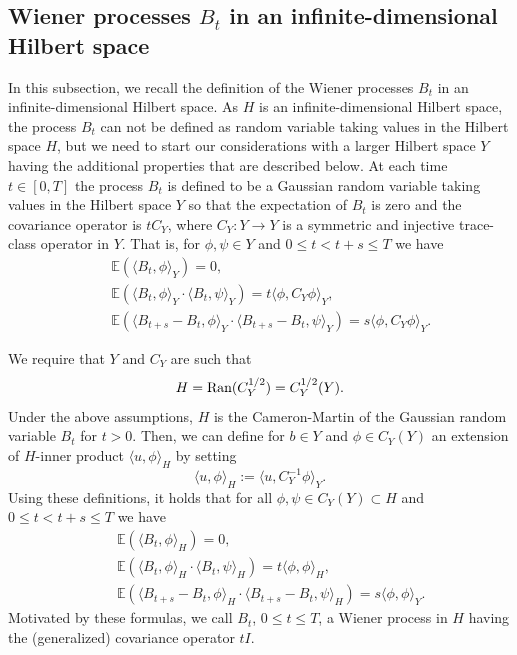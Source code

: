 \documentclass[10pt]{article} %
\theoremstyle{plain}
\theoremstyle{definition}
\theoremstyle{remark}
\begin{document}
\subsection{Wiener processes $B_t$ in an infinite-dimensional Hilbert space}
\label{subsec: Wiener process definition}
\label{appendix:wiener_process}

In this subsection, we recall the definition of the Wiener processes $B_t$ in an infinite-dimensional Hilbert space.  As $H$ is an infinite-dimensional Hilbert space, the process 
$B_t$ can not be defined as random variable taking values in the Hilbert space $H$, but we need
to start our considerations with a larger Hilbert space $Y$ having the additional properties
that are described below.
At each time $t\in [0,T]$ the process $B_t$ is defined to be a Gaussian random
variable taking values in the Hilbert space $Y$ so that
 the expectation of $B_t$ is zero and the covariance operator  is
$tC_Y$, where $C_Y\colon Y\to Y$ is a symmetric and injective trace-class operator in $Y$.
That is, for $\phi,\psi\in Y$ and $0\le t<t+s\le T$ we have
\begin{eqnarray*}
& &    \mathbb E(\langle B_t, \phi\rangle_Y)=0,\\
& &\mathbb E( \langle B_t, \phi\rangle_Y\cdot 
\langle B_t, \psi\rangle_Y)=t\langle \phi,C_Y \phi\rangle_Y,
\\
& &\mathbb E( \langle B_{t+s}-B_t, \phi\rangle_Y\cdot\langle B_{t+s}-B_t, \psi\rangle_Y)=s\langle \phi,C_Y \phi\rangle_Y.
\end{eqnarray*}

We require that $Y$ and $C_Y$ are such that
\begin{equation*}
H=\hbox{Ran}(C_Y^{1/2})=C_Y^{1/2}(Y).
\end{equation*}
Under the above assumptions, $H$ is the Cameron-Martin 
of the Gaussian random variable $B_t$ for $t>0$. Then, we can define for $b\in Y$ and $\phi\in C_Y(Y)$ an
extension of $H$-inner product $\langle u, \phi\rangle_H$
by setting
$$
\langle u, \phi\rangle_H:=\langle u,C_Y^{-1} \phi\rangle_Y.
$$
Using these definitions,
it holds that for all $\phi,\psi\in C_Y(Y)\subset H$ and $0\le t<t+s\le T$ we have
\begin{eqnarray*}
& &    \mathbb E(\langle B_t, \phi\rangle_H)=0,\\
& &\mathbb E( \langle B_t, \phi\rangle_H\cdot 
\langle B_t, \psi\rangle_H)=t\langle \phi, \phi\rangle_H,
\\
& &\mathbb E( \langle B_{t+s}-B_t, \phi\rangle_H\cdot 
\langle B_{t+s}-B_t, \psi\rangle_H)=s\langle \phi, \phi\rangle_Y.
\end{eqnarray*}
Motivated by these formulas, we call $B_t$, $0\le t\le T$, a Wiener process in $H$
having the (generalized) covariance operator $tI$.
\end{document}

